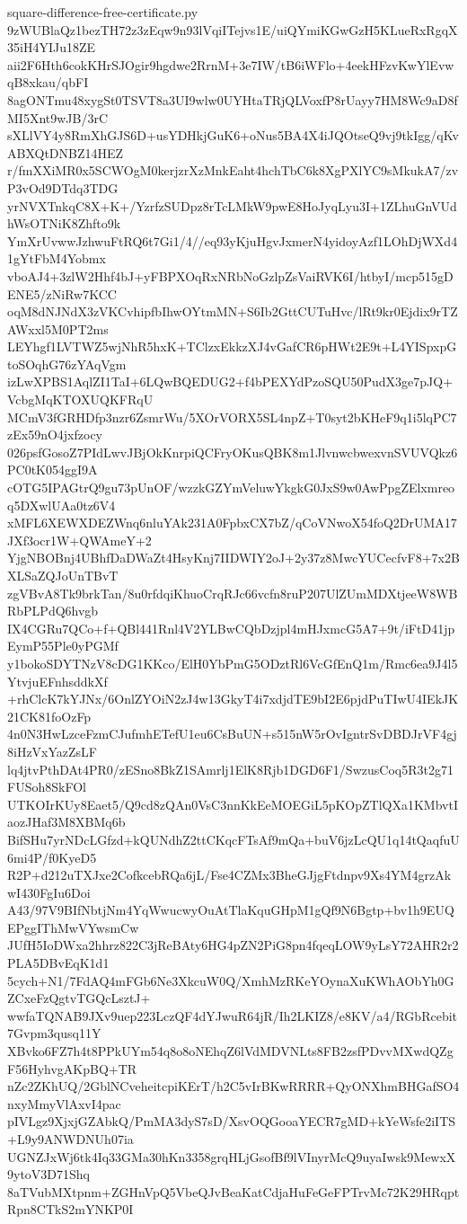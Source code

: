 \documentclass[11pt]{article}
\theoremstyle{definition}
\theoremstyle{remark}
\begin{document}
\begin{filecontents*}[overwrite]{square-difference-free-certificate.py}
9zWUBlaQz1bezTH72z3zEqw9n93lVqiITejvs1E/uiQYmiKGwGzH5KLueRxRgqX35iH4YIJu18ZE
aii2F6Hth6cokKHrSJOgir9hgdwe2RrnM+3e7IW/tB6iWFlo+4eekHFzvKwYlEvwqB8xkau/qbFI
8agONTmu48xygSt0TSVT8a3UI9wlw0UYHtaTRjQLVoxfP8rUayy7HM8Wc9aD8fMI5Xnt9wJB/3rC
sXLlVY4y8RmXhGJS6D+usYDHkjGuK6+oNus5BA4X4iJQOtseQ9vj9tkIgg/qKvABXQtDNBZ14HEZ
r/fmXXiMR0x5SCWOgM0kerjzrXzMnkEaht4hchTbC6k8XgPXlYC9sMkukA7/zvP3vOd9DTdq3TDG
yrNVXTnkqC8X+K+/YzrfzSUDpz8rTcLMkW9pwE8HoJyqLyu3I+1ZLhuGnVUdhWsOTNiK8Zhfto9k
YmXrUvwwJzhwuFtRQ6t7Gi1/4//eq93yKjuHgvJxmerN4yidoyAzf1LOhDjWXd41gYtFbM4Yobmx
vboAJ4+3zlW2Hhf4bJ+yFBPXOqRxNRbNoGzlpZsVaiRVK6I/htbyI/mcp515gDENE5/zNiRw7KCC
oqM8dNJNdX3zVKCvhipfbIhwOYtmMN+S6Ib2GttCUTuHvc/lRt9kr0Ejdix9rTZAWxxl5M0PT2ms
LEYhgf1LVTWZ5wjNhR5hxK+TClzxEkkzXJ4vGafCR6pHWt2E9t+L4YISpxpGtoSOqhG76zYAqVgm
izLwXPBS1AqlZI1TaI+6LQwBQEDUG2+f4bPEXYdPzoSQU50PudX3ge7pJQ+VcbgMqKTOXUQKFRqU
MCmV3fGRHDfp3nzr6ZsmrWu/5XOrVORX5SL4npZ+T0syt2bKHeF9q1i5lqPC7zEx59nO4jxfzocy
026psfGosoZ7PIdLwvJBjOkKnrpiQCFryOKusQBK8m1JlvnwcbwexvnSVUVQkz6PC0tK054ggI9A
cOTG5IPAGtrQ9gu73pUnOF/wzzkGZYmVeluwYkgkG0JxS9w0AwPpgZElxmreoq5DXwlUAa0tz6V4
xMFL6XEWXDEZWnq6nluYAk231A0FpbxCX7bZ/qCoVNwoX54foQ2DrUMA17JXf3ocr1W+QWAmeY+2
YjgNBOBnj4UBhfDaDWaZt4HsyKnj7IIDWIY2oJ+2y37z8MwcYUCecfvF8+7x2BXLSaZQJoUnTBvT
zgVBvA8Tk9brkTan/8u0rfdqiKhuoCrqRJc66vcfn8ruP207UlZUmMDXtjeeW8WBRbPLPdQ6hvgb
IX4CGRu7QCo+f+QBl441Rnl4V2YLBwCQbDzjpl4mHJxmcG5A7+9t/iFtD41jpEymP55Ple0yPGMf
y1bokoSDYTNzV8cDG1KKco/ElH0YbPmG5ODztRl6VcGfEnQ1m/Rmc6ea9J4l5YtvjuEFnhsddkXf
+rhClcK7kYJNx/6OnlZYOiN2zJ4w13GkyT4i7xdjdTE9bI2E6pjdPuTIwU4IEkJK21CK81foOzFp
4n0N3HwLzceFzmCJufmhETefU1eu6CsBuUN+s515nW5rOvIgntrSvDBDJrVF4gj8iHzVxYazZsLF
lq4jtvPthDAt4PR0/zESno8BkZ1SAmrlj1ElK8Rjb1DGD6F1/SwzusCoq5R3t2g71FUSoh8SkFOl
UTKOIrKUy8Eaet5/Q9cd8zQAn0VsC3nnKkEeMOEGiL5pKOpZTlQXa1KMbvtIaozJHaf3M8XBMq6b
BifSHu7yrNDcLGfzd+kQUNdhZ2ttCKqcFTsAf9mQa+buV6jzLcQU1q14tQaqfuU6mi4P/f0KyeD5
R2P+d212uTXJxe2CofkcebRQa6jL/Fse4CZMx3BheGJjgFtdnpv9Xs4YM4grzAkwI430FgIu6Doi
A43/97V9BIfNbtjNm4YqWwucwyOuAtTlaKquGHpM1gQf9N6Bgtp+bv1h9EUQEPggIThMwVYwsmCw
JUfH5IoDWxa2hhrz822C3jReBAty6HG4pZN2PiG8pn4fqeqLOW9yLsY72AHR2r2PLA5DBvEqK1d1
5cych+N1/7FdAQ4mFGb6Ne3XkcuW0Q/XmhMzRKeYOynaXuKWhAObYh0GZCxeFzQgtvTGQcLsztJ+
wwfaTQNAB9JXv9uep223LczQF4dYJwuR64jR/Ih2LKIZ8/e8KV/a4/RGbRcebit7Gvpm3qusq11Y
XBvko6FZ7h4t8PPkUYm54q8o8oNEhqZ6lVdMDVNLts8FB2zsfPDvvMXwdQZgF56HyhvgAKpBQ+TR
nZc2ZKhUQ/2GblNCveheitcpiKErT/h2C5vIrBKwRRRR+QyONXhmBHGafSO4nxyMmyVlAxvI4pac
pIVLgz9XjxjGZAbkQ/PmMA3dyS7sD/XsvOQGooaYECR7gMD+kYeWsfe2iITS+L9y9ANWDNUh07ia
UGNZJxWj6tk4Iq33GMa30hKn3358grqHLjGsofBf9lVInyrMcQ9uyaIwsk9MewxX9ytoV3D71Shq
8aTVubMXtpnm+ZGHnVpQ5VbeQJvBeaKatCdjaHuFeGeFPTrvMc72K29HRqptRpn8CTkS2mYNKP0I

\end{filecontents*}
\end{document}
